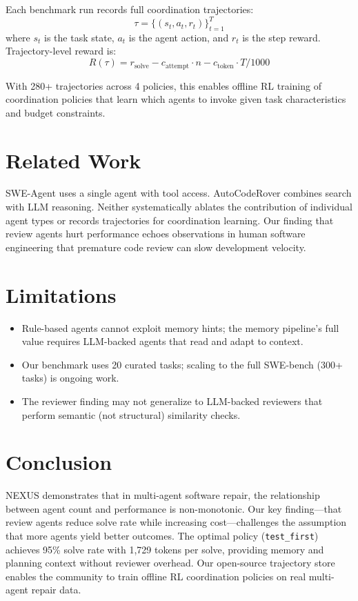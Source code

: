 \documentclass[11pt]{article}
\begin{document}
Each benchmark run records full coordination trajectories:
\[
\tau = \{(s_t, a_t, r_t)\}_{t=1}^{T}
\]
where $s_t$ is the task state, $a_t$ is the agent action, and $r_t$ is
the step reward. Trajectory-level reward is:
\[
R(\tau) = r_{\text{solve}} - c_{\text{attempt}} \cdot n - c_{\text{token}} \cdot T/1000
\]

With 280+ trajectories across 4 policies, this enables offline RL training
of coordination policies that learn which agents to invoke given task
characteristics and budget constraints.

\section{Related Work}

SWE-Agent \citep{yang2024sweagent} uses a single agent with tool access.
AutoCodeRover \citep{zhang2024autocoderover} combines search with LLM reasoning.
Neither systematically ablates the contribution of individual agent types
or records trajectories for coordination learning. Our finding that
review agents hurt performance echoes observations in human software
engineering that premature code review can slow development velocity.

\section{Limitations}

\begin{itemize}
    \item Rule-based agents cannot exploit memory hints; the memory pipeline's
    full value requires LLM-backed agents that read and adapt to context.
    \item Our benchmark uses 20 curated tasks; scaling to the full
    SWE-bench (300+ tasks) is ongoing work.
    \item The reviewer finding may not generalize to LLM-backed reviewers
    that perform semantic (not structural) similarity checks.
\end{itemize}

\section{Conclusion}

NEXUS demonstrates that in multi-agent software repair, the relationship
between agent count and performance is non-monotonic. Our key finding---that
review agents reduce solve rate while increasing cost---challenges the
assumption that more agents yield better outcomes. The optimal policy
(\texttt{test\_first}) achieves 95\% solve rate with 1,729 tokens per
solve, providing memory and planning context without reviewer overhead.
Our open-source trajectory store enables the community to train offline
RL coordination policies on real multi-agent repair data.
\end{document}
